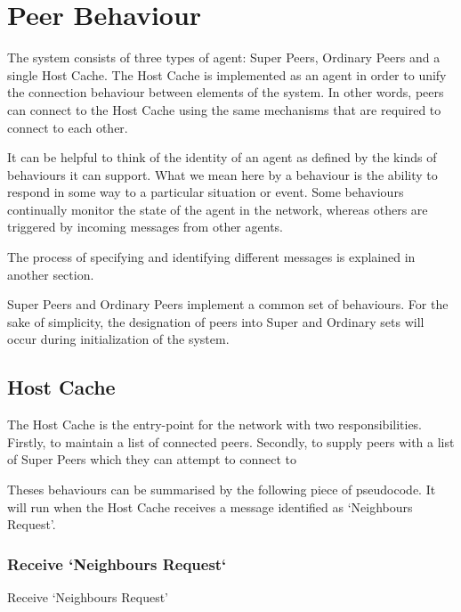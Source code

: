 \section{Peer Behaviour}

The system consists of three types of agent: Super Peers, Ordinary Peers and a
single Host Cache.  The Host Cache is implemented as an agent in order to unify
the connection behaviour between elements of the system.  In other words, peers
can connect to the Host Cache using the same mechanisms that are required to
connect to each other.

It can be helpful to think of the identity of an agent as defined by the kinds
of behaviours it can support. What we mean here by a behaviour is the ability to
respond in some way to a particular situation or event.  Some behaviours
continually monitor the state of the agent in the network, whereas others
are triggered by incoming messages from other agents.

The process of specifying and identifying different messages is explained in
another section.

Super Peers and Ordinary Peers implement a common set of behaviours. For
the sake of simplicity, the designation of peers into Super and Ordinary sets
will occur during initialization of the system.

\subsection{Host Cache}

The Host Cache is the entry-point for the network with two responsibilities.
Firstly, to maintain a list of connected peers. Secondly, to supply peers with a
list of Super Peers which they can attempt to connect to

Theses behaviours can be summarised by the following piece of pseudocode. It
will run when the Host Cache receives a message identified as `Neighbours
Request'.

\subsubsection{Receive `Neighbours Request`}

\begin{algorithm}[H]
\caption{Receive `Neighbours Request'}
\end{algorithm}


